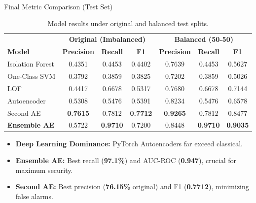 \documentclass[10pt]{beamer}
\begin{document}
\begin{frame}{Final Metric Comparison (Test Set)}
  \begin{table}
    \centering
    \caption{Model results under original and balanced test splits.}
    \scriptsize
    \begin{tabular}{l|ccc|ccc}
      \hline
      & \multicolumn{3}{c|}{\textbf{Original (Imbalanced)}} & \multicolumn{3}{c}{\textbf{Balanced (50-50)}} \\
      \textbf{Model} & \textbf{Precision} & \textbf{Recall} & \textbf{F1} & \textbf{Precision} & \textbf{Recall} & \textbf{F1} \\ \hline
      Isolation Forest & 0.4351 & 0.4453 & 0.4402 & 0.7639 & 0.4453 & 0.5627 \\
      One-Class SVM & 0.3792 & 0.3859 & 0.3825 & 0.7202 & 0.3859 & 0.5026 \\
      LOF & 0.4417 & 0.6678 & 0.5317 & 0.7680 & 0.6678 & 0.7144 \\
      Autoencoder & 0.5308 & 0.5476 & 0.5391 & 0.8234 & 0.5476 & 0.6578 \\
      Second AE & \textbf{0.7615} & 0.7812 & \textbf{0.7712} & \textbf{0.9265} & 0.7812 & 0.8477 \\
      \textbf{Ensemble AE} & 0.5722 & \textbf{0.9710} & 0.7200 & 0.8448 & \textbf{0.9710} & \textbf{0.9035} \\ \hline
    \end{tabular}
  \end{table}
  \begin{itemize}
    \item \textbf{Deep Learning Dominance:} PyTorch Autoencoders far exceed classical.
    \item \textbf{Ensemble AE:} Best recall (\textbf{97.1\%}) and AUC-ROC (\textbf{0.947}), crucial for maximum security.
    \item \textbf{Second AE:} Best precision (\textbf{76.15\%} original) and F1 (\textbf{0.7712}), minimizing false alarms.
  \end{itemize}
\end{frame}
\end{document}
